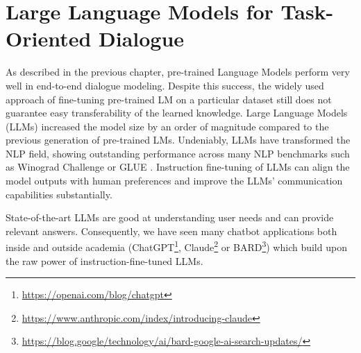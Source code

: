 \chapter{Large Language Models for Task-Oriented Dialogue}
\label{chap:llms}

\label{07:sec:intro}
As described in the previous chapter, pre-trained Language Models perform very well in end-to-end dialogue modeling.
Despite this success, the widely used approach of fine-tuning pre-trained LM on a particular dataset still does not guarantee easy transferability of the learned knowledge.
Large Language Models (LLMs) increased the model size by an order of magnitude compared to the previous generation of pre-trained LMs.
Undeniably, LLMs have transformed the NLP field,
showing outstanding performance across many NLP benchmarks such as Winograd Challenge \cite{levesque2012winograd} or GLUE \cite{wang2018glue}.
Instruction fine-tuning of LLMs can align the model outputs with human preferences \cite{ouyang2022training,supernaturalinstructions} and improve the LLMs' communication capabilities substantially.

State-of-the-art LLMs are good at understanding user needs and can provide relevant answers.
Consequently, we have seen many chatbot applications both inside and outside academia (ChatGPT\footnote{\url{https://openai.com/blog/chatgpt}}, Claude\footnote{\url{https://www.anthropic.com/index/introducing-claude}} or BARD\footnote{\url{https://blog.google/technology/ai/bard-google-ai-search-updates/}}) which build upon the raw power of instruction-fine-tuned LLMs.

